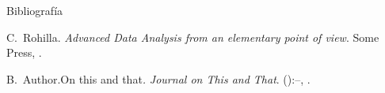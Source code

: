 \documentclass{beamer}
\begin{document}
\begin{frame}{Bibliografía}
	\begin{thebibliography}{2}
		\beamertemplatebookbibitems
		C.\ Rohilla. \newblock\emph{Advanced Data Analysis from an elementary point of view}.\newblock
\textlatin{Some Press, }.

		\beamertemplatearticlebibitems
		B.\ Author.\newblock On this and that\emph{.}
\newblock\emph{Journal on This and That}. 
():--, 
.
	\end{thebibliography}
\end{frame}

\end{document}
